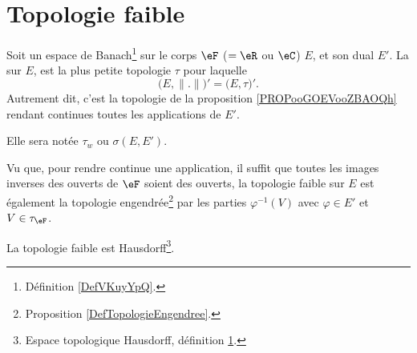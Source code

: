 
\section{Topologie faible}

\begin{definition}        \label{DEFooZGLDooRRarRj}
    Soit un espace de Banach\footnote{Définition \ref{DefVKuyYpQ}.} sur le corps \( \eF\) (\( =\eR\) ou \( \eC\)) \( E\), et son dual \( E'\). La  sur \( E\), est la plus petite topologie \( \tau\) pour laquelle 
    \begin{equation}
        \big( E,\| . \| \big)'=\big( E,\tau \big)'.
    \end{equation}
    Autrement dit, c'est la topologie de la proposition \ref{PROPooGOEVooZBAOQh} rendant continues toutes les applications de \( E'\).

    Elle sera notée \( \tau_w\) ou \( \sigma(E,E')\).
\end{definition}

Vu que, pour rendre continue une application, il suffit que toutes les images inverses des ouverts de \( \eF\) soient des ouverts, la topologie faible sur \( E\) est également la topologie engendrée\footnote{Proposition \ref{DefTopologieEngendree}.} par les parties $\varphi^{-1}(V)$ avec \( \varphi\in E'\) et \( V\in \tau_{\eF}\).

\begin{lemma}
    La topologie faible est Hausdorff\footnote{Espace topologique Hausdorff, définition \ref{}.}.
\end{lemma}

